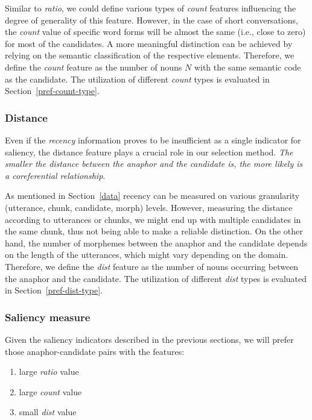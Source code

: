 Similar to {\em ratio}, we could define various types of {\em count} features influencing
the degree of generality of this feature. However, in the case of short conversations,
the {\em count} value of specific word forms will be almost the same (i.e., close to zero)
for most of the candidates. A more meaningful distinction can be achieved by relying on the
semantic classification of the respective elements.
Therefore, we define the {\em count} feature as the number of nouns $N$ with
the same semantic code as the candidate. The utilization of different {\em count} types
is evaluated in Section~\ref{pref-count-type}.
\vspace*{-1em}

\subsubsection{Distance}
\label{pref-dist}

Even if the {\em recency} information proves to be insufficient as a single indicator
for saliency, the distance feature plays a crucial role in our selection method.
{\em The smaller the distance between the anaphor and the candidate is, the more likely
is a coreferential relationship}.

As mentioned in Section~\ref{data} recency can be measured on various granularity
(utterance, chunk, candidate, morph) levels. However, measuring the distance
according to utterances or chunks, we might end up with multiple candidates in the same
chunk, thus not being able to make a reliable distinction. On the other hand, the
number of morphemes between the anaphor and the candidate depends on the length of 
the utterances, which might vary depending on the domain. Therefore, we define
the {\em dist} feature as the number of nouns occurring between the anaphor
and the candidate. The utilization of different {\em dist} types
is evaluated in Section~\ref{pref-dist-type}.
\vspace*{-1em}

\subsubsection{Saliency measure}
\label{pref-pref}

Given the saliency indicators described in the previous sections, we will prefer
those anaphor-candidate pairs with the features:
\vspace*{-0.1em}

\begin{center}
\parbox{4.5cm}{
 \begin{enumerate}
  \item large {\em ratio} value
  \item large {\em count} value
  \item small {\em dist} value \\[-1.2em]
 \end{enumerate}
 }
\end{center}

